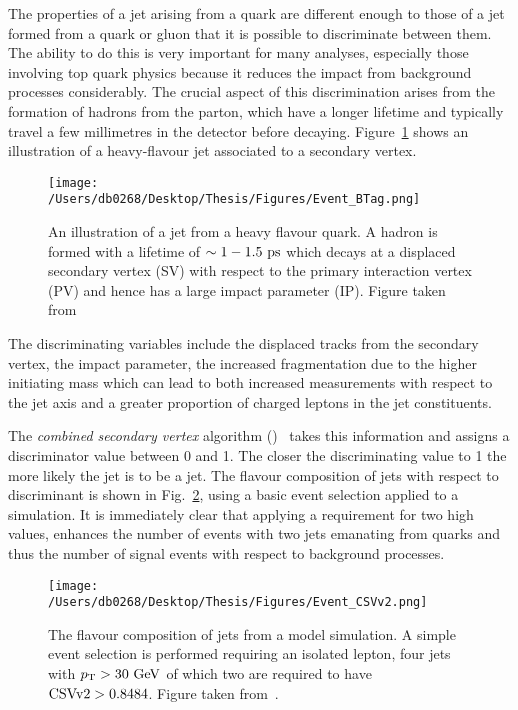 The properties of a jet arising from a \bquark{} quark are different enough to those of a jet formed from a \uquark{}\dquark{}\squark{} quark or gluon that it is possible to discriminate between them.
The ability to do this is very important for many analyses, especially those involving top quark physics because it reduces the impact from background processes considerably.
The crucial aspect of this discrimination arises from the formation of \bquark{} hadrons from the \bquark{} parton, which have a longer lifetime and typically travel a few millimetres in the detector before decaying.
Figure~\ref{fig:secvert} shows an illustration of a heavy-flavour jet associated to a secondary vertex.
\begin{figure}[htpb]
	\centering
	\texttt{[image: /Users/db0268/Desktop/Thesis/Figures/Event\_BTag.png]}
	\caption[An illustration of a jet from a heavy flavour quark. A hadron is formed with a lifetime of $\sim1-1.5\ps$ which decays at a displaced secondary vertex (SV) with respect to the primary interaction vertex (PV) and hence has a large impact parameter (IP).]{An illustration of a jet from a heavy flavour quark. A hadron is formed with a lifetime of $\sim1-1.5\ps$ which decays at a displaced secondary vertex (SV) with respect to the primary interaction vertex (PV) and hence has a large impact parameter (IP). Figure taken from~\cite{Event:BTV}}
	\label{fig:secvert}
\end{figure}
The discriminating variables include the displaced tracks from the secondary vertex, the impact parameter, the increased fragmentation due to the higher initiating mass which can lead to both increased \pt{} measurements with respect to the jet axis and a greater proportion of charged leptons in the jet constituents.

The \textit{combined secondary vertex} algorithm (\CSV)~\cite{Event:BTV} takes this information and assigns a discriminator value between 0 and 1.
The closer the discriminating value to 1 the more likely the jet is to be a \bquark{} jet.
The flavour composition of jets with respect to \CSV{} discriminant is shown in Fig.~\ref{fig:csv}, using a basic event selection applied to a \ttbar{} simulation.
It is immediately clear that applying a requirement for two high \CSV{} values, enhances the number of events with two jets emanating from \bquark{} quarks and thus the number of signal \ttbar{} events with respect to background processes.
\begin{figure}[htpb!]
	\centering
	\texttt{[image: /Users/db0268/Desktop/Thesis/Figures/Event\_CSVv2.png]}
	\caption[The flavour composition of jets from a \ttbar{} model simulation. A simple event selection is performed requiring an isolated lepton, four jets with $\pt>30\GeV$ of which two are required to have $\CSV>0.8484$.]{The flavour composition of jets from a \ttbar{} model simulation. A simple event selection is performed requiring an isolated lepton, four jets with $\pt>30\GeV$ of which two are required to have $\CSV>0.8484$. Figure taken from~\cite{Event:BTV}.}
	\label{fig:csv}
\end{figure}

